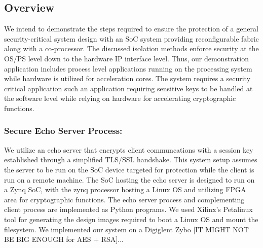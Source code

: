\documentclass[sigconf]{acmart}
\theoremstyle{plain}
\theoremstyle{remark}
\begin{document}

%


\subsection{Overview}

We intend to demonstrate the steps required to ensure the protection of a general security-critical system design with an SoC system providing reconfigurable fabric along with a co-processor. The discussed isolation methods enforce security at the OS/PS level down to the hardware IP interface level. Thus, our demonstration application includes process level applications running on the processing system while hardware is utilized for acceleration cores. The system requires a security critical application such an application requiring sensitive keys to be handled at the software level while relying on hardware for accelerating cryptographic functions.

\subsubsection{Secure Echo Server Process:}
We utilize an echo server that encrypts client communcations with a session key established through a simplified TLS/SSL handshake. This system setup assumes the server to be run on the SoC device targeted for protection while the client is run on a remote machine. The SoC hosting the echo server is designed to run on a Zynq SoC, with the zynq processor hosting a Linux OS and utilizing FPGA area for cryptographic functions. The echo server process and complementing client process are implemented as Python programs. We used Xilinx's Petalinux tool for generating the design images required to boot a Linux OS and mount the filesystem. We implemented our system on a Digiglent Zybo [IT MIGHT NOT BE BIG ENOUGH for AES + RSA]...
\end{document}
